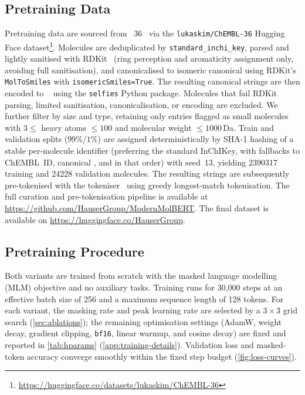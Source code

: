 \documentclass[11pt,a4paper]{article}
\begin{document}
\subsection{Pretraining Data}
\label{sec:pretraining-data}

Pretraining data are sourced from \chembl{}~36~\citep{zdrazilChEMBLDatabase20232024}
via the \texttt{lukaskim/ChEMBL-36} Hugging Face dataset\footnote{\url{https://huggingface.co/datasets/lukaskim/ChEMBL-36}}.
Molecules are deduplicated by \texttt{standard\_inchi\_key}, parsed and
lightly sanitised with RDKit~\citep{landrumRDKitOpenSourceCheminformatics} (ring perception and aromaticity assignment
only, avoiding full sanitisation), and canonicalised to isomeric
canonical \smiles{} using RDKit's \texttt{MolToSmiles} with
\texttt{isomericSmiles=True}.
The resulting canonical \smiles{} strings are then encoded to
\selfies{}~\citep{krennSELFIESSelfReferencingEmbedded2020} using the
\texttt{selfies} Python package.
Molecules that fail RDKit parsing, limited sanitisation,
canonicalisation, or \selfies{} encoding are excluded.
We further filter by size and type, retaining only entries flagged as
small molecules with $3 \le$ heavy atoms $\le 100$ and molecular weight
$\le 1000$\,Da.
Train and validation splits ($99\%$/$1\%$) are assigned deterministically
by SHA-1 hashing of a stable per-molecule identifier (preferring the
standard InChIKey, with fallbacks to ChEMBL~ID, canonical \smiles{}, and
\selfies{} in that order) with seed~13,
yielding \num{2390317} training and \num{24228} validation molecules.
The resulting \selfies{} strings are subsequently pre-tokenised with the
\ape{} tokeniser~\citep{leonComparingSMILESSELFIES2024} using greedy
longest-match tokenisation.
The full curation and pre-tokenisation pipeline is available at
\url{https://github.com/HauserGroup/ModernMolBERT}. The final dataset is available on \url{https://huggingface.co/HauserGroup}.

\subsection{Pretraining Procedure}
\label{sec:pretraining-procedure}

Both \model{} variants are trained from scratch with the masked language
modelling (MLM) objective and no auxiliary tasks. Training runs for 30{,}000
steps at an effective batch size of 256 and a maximum sequence length of 128
tokens. For each variant, the masking rate and peak learning rate are selected
by a $3\times3$ grid search (\cref{sec:ablations}); the remaining optimisation
settings (AdamW, weight decay, gradient clipping, \texttt{bf16}, linear warmup,
and cosine decay) are fixed and reported in \cref{tab:hparams}
(\cref{app:training-details}). Validation loss and masked-token accuracy
converge smoothly within the fixed step budget (\cref{fig:loss-curves}).
\end{document}
